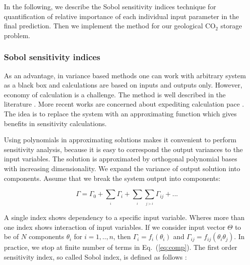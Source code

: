 In the following, we describe the Sobol sensitivity indices technique for quantification of relative importance of each individual input parameter in the final prediction. Then we implement the method for our geological $\mbox{CO}_{2}$ storage problem.


\subsubsection{Sobol sensitivity indices}

As an advantage, in variance based methods one can work with arbitrary system as a black box and calculations are based on inputs and outputs only. However, economy of calculation is a challenge. The method is well described in the literature \cite{sobol2001global,saltelli2007global,saltelli4global,reuter2008global}. More recent works are concerned about expediting calculation pace \cite{crestaux2009polynomial,oladyshkin2011concept, OladNowakBarros_AWR2011}. The idea is to replace the system with an approximating function which gives benefits in sensitivity calculations.

Using polynomials in approximating solutions makes it convenient to perform sensitivity analysis, because it is easy to correspond the output variances to the input variables. The solution is approximated by orthogonal polynomial bases with increasing dimensionality. We expand the variance of output solution into components. Assume that we break the system output into components:

\begin{equation}
\Gamma=\Gamma_{0}+\underset{_{i}}{\sum}\Gamma_{i}+\underset{_{i}}{\sum}\underset{_{j>i}}{\sum}\Gamma_{ij}+...\label{eq:comp}\end{equation}

A single index shows dependency to a specific input variable. Wheres more than one index shows interaction of input variables. If we consider input vector $\Theta$ to be of $N$ components $\theta_{i}$ for $i=1,..,n$, then $\Gamma_{i}=f_{i}(\theta_{i})$ and $\Gamma_{ij}=f_{ij}(\theta_{i}\theta_{j})$. In practice, we stop at finite number of terms in Eq.~(\ref{eq:comp}).
 The first order sensitivity index, so called Sobol index, is defined as follows \cite{saltelli2007global}:

